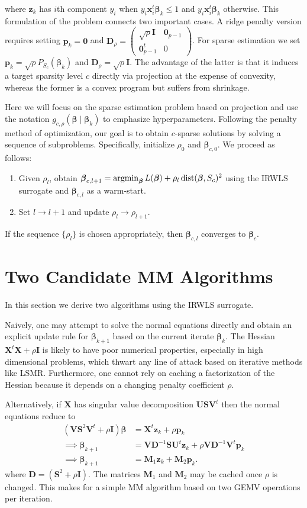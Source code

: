 \documentclass[11pt]{article}
\def\dist{\mathop{\rm dist}\nolimits}
\def\argmin{\mathop{\rm argmin}\nolimits}
\newcommand{\bzero}{\boldsymbol{0}}
\newcommand{\bp}{\boldsymbol{p}}
\newcommand{\bx}{\boldsymbol{x}}
\newcommand{\bz}{\boldsymbol{z}}
\newcommand{\bD}{\boldsymbol{D}}
\newcommand{\bI}{\boldsymbol{I}}
\newcommand{\bM}{\boldsymbol{M}}
\newcommand{\bS}{\boldsymbol{S}}
\newcommand{\bU}{\boldsymbol{U}}
\newcommand{\bV}{\boldsymbol{V}}
\newcommand{\bX}{\boldsymbol{X}}
\newcommand{\bbeta}{\boldsymbol{\beta}}
\begin{document}
where $\bz_k$ has $i$th component $y_i$ when $y_i \bx_i^t\bbeta_k \le 1$
and $y_i \bx_i^t\bbeta_k$ otherwise. 
This formulation of the problem connects two important cases.
A ridge penalty version requires setting $\bp_{k} = \bzero$ and $\bD_{\rho} = \begin{pmatrix} \sqrt{\rho} \bI & \bzero_{p-1} \\ \bzero_{p-1}^{t} & 0 \end{pmatrix}$.
For sparse estimation we set $\bp_k = \sqrt{\rho} P_{S_{c}}(\bbeta_k)$ and $\bD_{\rho} = \sqrt{\rho} \bI$.
The advantage of the latter is that it induces a target sparsity level $c$ directly via projection at the expense of convexity, whereas the former is a convex program but suffers from shrinkage.

Here we will focus on the sparse estimation problem based on projection and use the notation $g_{c,\rho}(\bbeta \mid \bbeta_{k})$ to emphasize hyperparameters.
Following the penalty method of optimization, our goal is to obtain $c$-sparse solutions by solving a sequence of subproblems.
Specifically, initialize $\rho_{0}$ and $\bbeta_{c,0}$.
We proceed as follows:
\begin{enumerate}
    \item Given $\rho_{l}$, obtain $\bbeta_{c,l+1} = \argmin_{\bbeta} L(\bbeta) + \rho_{l} \dist(\bbeta, S_{c})^{2}$ using the IRWLS surrogate and $\bbeta_{c,l}$ as a warm-start.
    \item Set $l \to l + 1$ and update $\rho_{l} \to \rho_{l+1}$.
\end{enumerate}
If the sequence $\{\rho_{l}\}$ is chosen appropriately, then $\bbeta_{c,l}$ converges to $\bbeta_{c}$.

\section*{\center Two Candidate MM Algorithms}
In this section we derive two algorithms using the IRWLS surrogate.

Naively, one may attempt to solve the normal equations directly and obtain an explicit update rule for $\bbeta_{k+1}$ based on the current iterate $\bbeta_{k}$.
The Hessian $\bX^{t} \bX + \rho \bI$ is likely to have poor numerical properties, especially in high dimensional problems, which thwart any line of attack based on iterative methods like LSMR.
Furthermore, one cannot rely on caching a factorization of the Hessian because it depends on a changing penalty coefficient $\rho$.

Alternatively, if $\bX$ has singular value decomposition $\bU \bS \bV^{t}$ then the normal equations reduce to
\begin{align*}
    (\bV \bS^{2} \bV^{t} + \rho \bI) \bbeta &= \bX^{t} \bz_{k} + \rho \bp_{k} \\
    \implies \bbeta_{k+1} &= \bV \bD^{-1} \bS \bU^{t} \bz_{k}
    + \rho \bV \bD^{-1} \bV^{t} \bp_{k} \\
    \implies \bbeta_{k+1} &= \bM_{1} \bz_{k} + \bM_{2} \bp_{k}.
\end{align*}
where $\bD = (\bS^{2} + \rho \bI)$.
The matrices $\bM_{1}$ and $\bM_{2}$ may be cached once $\rho$ is changed.
This makes for a simple MM algorithm based on two GEMV operations per iteration.
\end{document}

